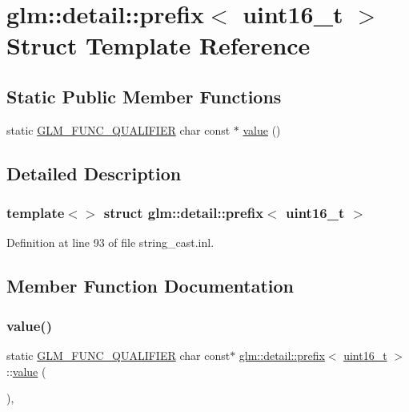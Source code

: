 \hypertarget{structglm_1_1detail_1_1prefix_3_01uint16__t_01_4}{}\section{glm\+::detail\+::prefix$<$ uint16\+\_\+t $>$ Struct Template Reference}
\label{structglm_1_1detail_1_1prefix_3_01uint16__t_01_4}
\subsection*{Static Public Member Functions}
\begin{DoxyCompactItemize}
\item 
static \mbox{\hyperlink{setup_8hpp_a33fdea6f91c5f834105f7415e2a64407}{G\+L\+M\+\_\+\+F\+U\+N\+C\+\_\+\+Q\+U\+A\+L\+I\+F\+I\+ER}} char const  $\ast$ \mbox{\hyperlink{structglm_1_1detail_1_1prefix_3_01uint16__t_01_4_a9546e8aaf707c3f0028c8da94f6c06da}{value}} ()
\end{DoxyCompactItemize}


\subsection{Detailed Description}
\subsubsection*{template$<$$>$\newline
struct glm\+::detail\+::prefix$<$ uint16\+\_\+t $>$}



Definition at line 93 of file string\+\_\+cast.\+inl.



\subsection{Member Function Documentation}
\mbox{\label{structglm_1_1detail_1_1prefix_3_01uint16__t_01_4_a9546e8aaf707c3f0028c8da94f6c06da}} 
\subsubsection{\texorpdfstring{value()}{value()}}
{\footnotesize\ttfamily static \mbox{\hyperlink{setup_8hpp_a33fdea6f91c5f834105f7415e2a64407}{G\+L\+M\+\_\+\+F\+U\+N\+C\+\_\+\+Q\+U\+A\+L\+I\+F\+I\+ER}} char const$\ast$ \mbox{\hyperlink{structglm_1_1detail_1_1prefix}{glm\+::detail\+::prefix}}$<$ \mbox{\hyperlink{group__gtc__type__precision_gac4eb4f43cae8129b00086dc234d3b8fc}{uint16\+\_\+t}} $>$\+::\mbox{\hyperlink{glad_8h_a03aff08f73d7fde3d1a08e0abd8e84fa}{value}} (\begin{DoxyParamCaption}{ }\end{DoxyParamCaption})\hspace{0.3cm}{\ttfamily [inline]}, {\ttfamily [static]}}



